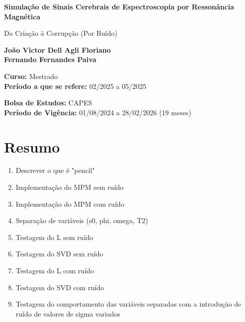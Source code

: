 \documentclass[12pt]{article}
\begin{document}
\begin{titlepage}
    \begin{center}
        \vspace*{1cm}
            
        \Huge
        \textbf{Simulação de Sinais Cerebrais de Espectroscopia por 
        Ressonância Magnética}
            
        \vspace{0.5cm}
        \LARGE
        Da Criação à Corrupção (Por Ruído)
            
        \vspace{1.5cm}
            
        \textbf{João Victor Dell Agli Floriano \\ Fernando Fernandes Paiva}

            
        \vfill
            
        \textbf{Curso:} Mestrado \\
        \textbf{Período a que se refere:} 02/2025 a 05/2025
            
        \vspace{0.8cm}
            
        \Large
        \textbf{Bolsa de Estudos:} CAPES \\
        \textbf{Período de Vigência:} 01/08/2024 a 28/02/2026 (19 meses)
            
    \end{center}
\end{titlepage}


\section{Resumo}

\begin{enumerate}
    \item Descrever o que é "pencil"
    \item Implementação do MPM sem ruído
    \item Implementação do MPM com ruído
    \item Separação de variáveis (s0, phi, omega, T2)
    \item Testagem do L sem ruído
    \item Testagem do SVD sem ruído
    \item Testagem do L com ruído
    \item Testagem do SVD com ruído
    \item Testagem do comportamento das variáveis separadas com a introdução de ruído de valores de sigma variados
\end{enumerate}
\end{document}
